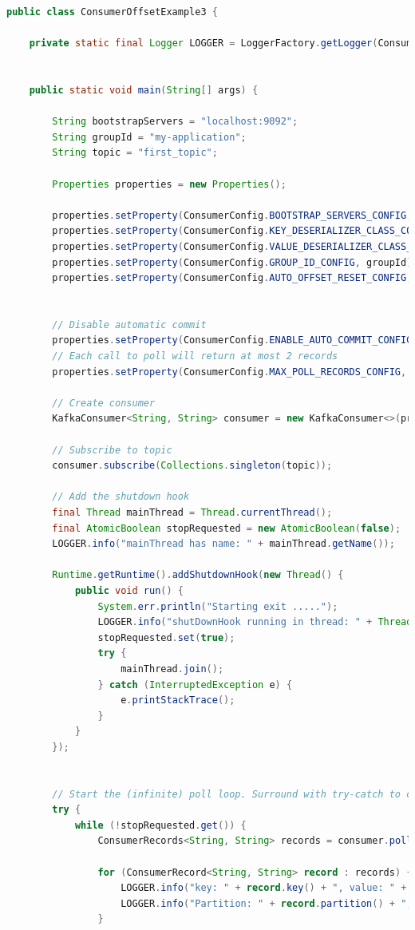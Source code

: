 \documentclass[a4paper,10pt,twoside]{report}
\begin{document}
\begin{lstlisting}[language=Java]
public class ConsumerOffsetExample3 {
	
	private static final Logger LOGGER = LoggerFactory.getLogger(ConsumerDemo.class);
	
	
	public static void main(String[] args) {
		
		String bootstrapServers = "localhost:9092";
		String groupId = "my-application";
		String topic = "first_topic";
		
		Properties properties = new Properties();
		
		properties.setProperty(ConsumerConfig.BOOTSTRAP_SERVERS_CONFIG, bootstrapServers);
		properties.setProperty(ConsumerConfig.KEY_DESERIALIZER_CLASS_CONFIG, StringDeserializer.class.getName());
		properties.setProperty(ConsumerConfig.VALUE_DESERIALIZER_CLASS_CONFIG, StringDeserializer.class.getName());
		properties.setProperty(ConsumerConfig.GROUP_ID_CONFIG, groupId);
		properties.setProperty(ConsumerConfig.AUTO_OFFSET_RESET_CONFIG, "earliest");
		
		
		// Disable automatic commit
		properties.setProperty(ConsumerConfig.ENABLE_AUTO_COMMIT_CONFIG, "false");
		// Each call to poll will return at most 2 records
		properties.setProperty(ConsumerConfig.MAX_POLL_RECORDS_CONFIG, "2"); 
		
		// Create consumer
		KafkaConsumer<String, String> consumer = new KafkaConsumer<>(properties);
		
		// Subscribe to topic
		consumer.subscribe(Collections.singleton(topic));
		
		// Add the shutdown hook
		final Thread mainThread = Thread.currentThread();
		final AtomicBoolean stopRequested = new AtomicBoolean(false);
		LOGGER.info("mainThread has name: " + mainThread.getName());
		
		Runtime.getRuntime().addShutdownHook(new Thread() {
			public void run() {
				System.err.println("Starting exit .....");
				LOGGER.info("shutDownHook running in thread: " + Thread.currentThread().getName());
				stopRequested.set(true);
				try {
					mainThread.join();
				} catch (InterruptedException e) {
					e.printStackTrace();
				}
			}
		});
		
		
		// Start the (infinite) poll loop. Surround with try-catch to catch the WakeupException
		try {
			while (!stopRequested.get()) {
				ConsumerRecords<String, String> records = consumer.poll(Duration.ofMillis(100));
				
				for (ConsumerRecord<String, String> record : records) {
					LOGGER.info("key: " + record.key() + ", value: " + record.value());
					LOGGER.info("Partition: " + record.partition() + ", Offset:" + record.offset());
				}
				

\end{lstlisting}
\end{document}
